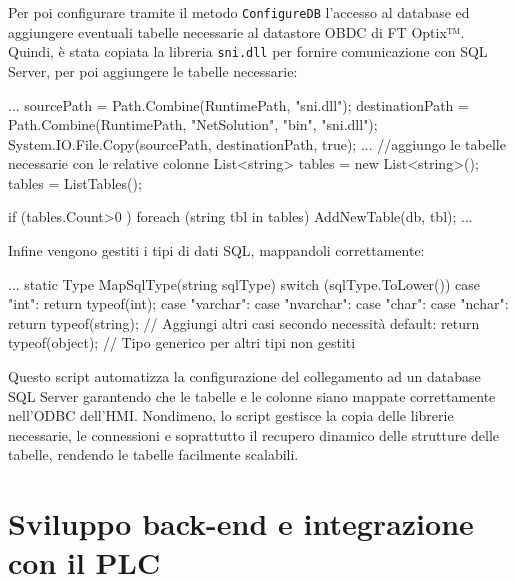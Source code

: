 Per poi configurare tramite il metodo \verb|ConfigureDB| l'accesso al database ed aggiungere eventuali tabelle necessarie al datastore OBDC di FT Optix™. Quindi, è stata copiata la libreria \verb|sni.dll| per fornire comunicazione con SQL Server, per poi aggiungere le tabelle necessarie:
\begin{csharp}
...
    sourcePath = Path.Combine(RuntimePath, "sni.dll");
    destinationPath = Path.Combine(RuntimePath, "NetSolution", "bin", "sni.dll");
    System.IO.File.Copy(sourcePath, destinationPath, true);
...
    //aggiungo le tabelle necessarie con le relative colonne
    List<string> tables = new List<string>();
    tables = ListTables();
    
    if (tables.Count>0 )
    {
        foreach (string tbl in tables)
        {
            AddNewTable(db, tbl);
        }
    }
...
\end{csharp}
Infine vengono gestiti i tipi di dati SQL, mappandoli correttamente:
\begin{csharp}
...
     static Type MapSqlType(string sqlType)
 {
     switch (sqlType.ToLower())
     {
         case "int":
             return typeof(int);
         case "varchar":
         case "nvarchar":
         case "char":
         case "nchar":
             return typeof(string);
         // Aggiungi altri casi secondo necessità
         default:
             return typeof(object); // Tipo generico per altri tipi non gestiti
     }
 }
\end{csharp}
Questo script automatizza la configurazione del collegamento ad un database SQL Server garantendo che le tabelle e le colonne siano mappate correttamente nell'ODBC dell’HMI. Nondimeno, lo script gestisce la copia delle librerie necessarie, le connessioni e soprattutto il recupero dinamico delle strutture delle tabelle, rendendo le tabelle facilmente scalabili.

\section{Sviluppo back-end e integrazione con il PLC}\label{sec:Sviluppo back-end e integrazione con il PLC}

